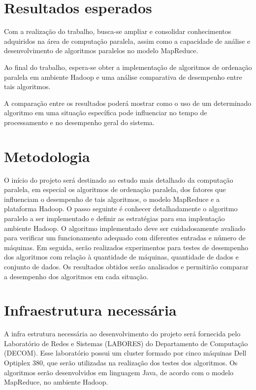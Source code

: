 \section{Resultados esperados}

Com a realização do trabalho, busca-se ampliar e consolidar conhecimentos adquiridos na área de computação paralela, assim como
a capacidade de análise e desenvolvimento de algoritmos paralelos no modelo MapReduce. 


Ao final do trabalho, espera-se obter a implementação de algoritmos de ordenação paralela em ambiente Hadoop e uma análise comparativa de desempenho entre tais algoritmos.

A comparação entre os resultados poderá mostrar como o uso de um determinado algoritmo em uma situação específica pode influenciar no tempo de processamento e no desempenho geral do sistema.
\section{Metodologia}

O início do projeto será destinado ao estudo mais detalhado da computação paralela, em especial os algoritmos de ordenação paralela, dos fatores que influenciam o desempenho de tais algoritmos, o modelo MapReduce e a plataforma Hadoop. O passo seguinte é conhecer detalhadamente o algoritmo paralelo a ser implementado e definir as estratégias para sua implentação ambiente Hadoop. 
O algoritmo implementado deve ser cuidadosamente avaliado para verificar um funcionamento adequado com diferentes entradas e número de máquinas. 
Em seguida, serão realizados experimentos para testes de desempenho dos algoritmos com relação à quantidade de máquinas, quantidade de dados e conjunto de dados.  Os resultados obtidos serão analisados e permitirão comparar a desempenho dos algoritmos em cada situação. 


\section{Infraestrutura necessária}

A infra estrutura necessária ao desenvolvimento do projeto será fornecida pelo Laboratório de Redes e Sistemas (LABORES) do Departamento de Computação (DECOM). Esse laboratório possui um cluster formado por cinco máquinas Dell Optiplex 380, que serão utilizadas na realização dos testes dos algoritmos. Os algoritmos serão desenvolvidos em linguagem Java, de acordo com o modelo MapReduce, no ambiente Hadoop. 

